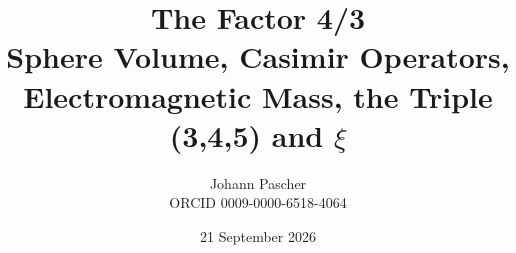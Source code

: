 \documentclass[11pt,a4paper]{report}
\title{The Factor 4/3\\[0.5em]\large Sphere Volume, Casimir Operators, Electromagnetic Mass, the Triple (3,4,5) and $\xi$}
\date{21 September 2026}
\author{Johann Pascher\\\small ORCID 0009-0000-6518-4064}
\begin{document}
\renewcommand{\thechapter}{}
\renewcommand{\thesection}{\arabic{section}}
\maketitle
\tableofcontents

\end{document}
